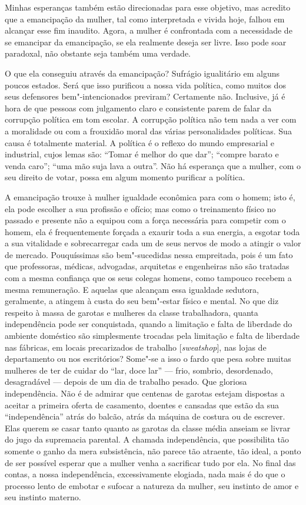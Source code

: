 Minhas esperanças também estão direcionadas para esse objetivo, mas
acredito que a emancipação da mulher, tal como interpretada e vivida
hoje, falhou em alcançar esse fim inaudito. Agora, a mulher é
confrontada com a necessidade de se emancipar da emancipação, se ela
realmente deseja ser livre. Isso pode soar paradoxal, não obstante seja
também uma verdade.

O que ela conseguiu através da emancipação? Sufrágio igualitário em
alguns poucos estados. Será que isso purificou a nossa vida política,
como muitos dos seus defensores bem"-intencionados previram? Certamente
não. Inclusive, já é hora de que pessoas com julgamento claro e
consistente parem de falar da corrupção política em tom escolar.
A corrupção política não tem nada a ver com a\label{suja}
moralidade ou com a frouxidão moral das várias personalidades
políticas. Sua causa é totalmente material. A política é o reflexo do
mundo empresarial e industrial, cujos lemas são: ``Tomar é melhor do que
dar''; ``compre barato e venda caro''; ``uma mão suja lava a outra''.
Não há esperança que a mulher, com o seu direito de votar, possa em
algum momento purificar a política.

A emancipação trouxe à mulher igualdade econômica para com o homem; isto
é, ela pode escolher a sua profissão e ofício; mas como o treinamento
físico no passado e presente não a equipou com a força necessária para
competir com o homem, ela é frequentemente forçada a exaurir toda a sua
energia, a esgotar toda a sua vitalidade e sobrecarregar cada um de seus
nervos de modo a atingir o valor de mercado. Pouquíssimas são
bem"-sucedidas nessa empreitada, pois é um fato que professoras, médicas,
advogadas, arquitetas e engenheiras não são tratadas com a mesma
confiança que os seus colegas homens, como tampouco recebem a mesma\label{igualdade}
remuneração. E aquelas que alcançam essa igualdade sedutora, geralmente,
a atingem à custa do seu bem"-estar físico e mental. No que diz respeito
à massa de garotas e mulheres da classe trabalhadora, quanta
independência pode ser conquistada, quando a limitação e falta de
liberdade do ambiente doméstico são simplesmente trocadas pela limitação e falta de
liberdade nas fábricas, em locais precarizados de trabalho
{[}\emph{sweatshop}{]}, nas lojas de departamento ou nos escritórios?
Some"-se a isso o fardo que pesa sobre muitas mulheres de ter de cuidar
do ``lar, doce lar'' --- frio, sombrio, desordenado, desagradável --- depois de um dia de trabalho pesado. Que gloriosa independência. Não é
de admirar que centenas de garotas estejam dispostas a aceitar a
primeira oferta de casamento, doentes e cansadas que estão da sua
``independência'' atrás do balcão, atrás da máquina de costura ou de
escrever. Elas querem se casar tanto quanto as garotas da classe média
anseiam se livrar do jugo da supremacia parental. A chamada\label{ganho}
independência, que possibilita tão somente o ganho da mera subsistência,
não parece tão atraente, tão ideal, a ponto de ser possível esperar que
a mulher venha a sacrificar tudo por ela. No final das contas, a nossa
independência, excessivamente elogiada, nada mais é do que o processo
lento de embotar e sufocar a natureza da mulher, seu instinto de amor e
seu instinto materno.

